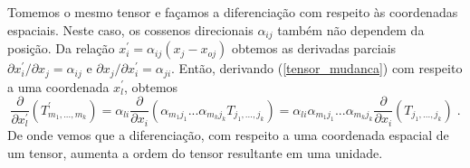 Tomemos o mesmo tensor e fa\c{c}amos a diferencia\c{c}\~ao com
respeito \`as coordenadas espaciais. Neste caso, os cossenos direcionais
$\alpha_{ij}$ tamb\'em n\~ao dependem da posi\c{c}\~ao. Da
rela\c{c}\~ao $x_i^{'}=\alpha_{ij}(x_j-x_{oj})$ obtemos as
derivadas parciais $\partial x_i^{'} / \partial x_j = \alpha_{ij}$
e $\partial x_j / \partial x_i^{'} = \alpha_{ji}$. Ent\~ao,
derivando (\ref{tensor_mudanca}) com respeito a uma coordenada
$x_l^{'}$, obtemos
\begin{equation}
\frac{\partial}{\partial
x_l^{'}}(T^{'}_{m_1,...,m_k})=\alpha_{li}\frac{\partial}{\partial
x_i}(\alpha_{m_1 j_1}...\alpha_{m_k
j_k}T_{j_1,...,j_k})=\alpha_{li}\alpha_{m_1 j_1}...\alpha_{m_k
j_k} \frac{\partial}{\partial x_i}(T_{j_1,...,j_k}) \;.
\end{equation}
De onde vemos que a diferencia\c{c}\~ao, com respeito a uma
coordenada espacial de um tensor, aumenta a ordem do tensor
resultante em uma unidade.
